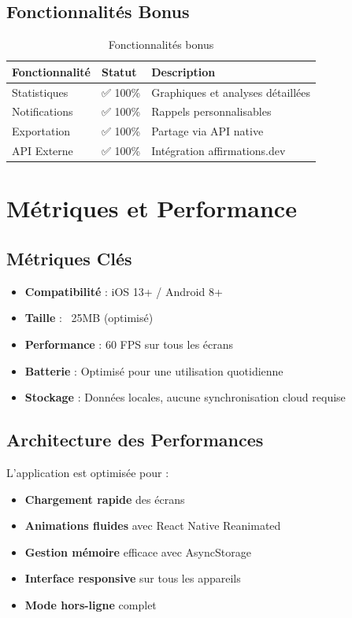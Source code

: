 \documentclass[12pt,a4paper]{article}
\begin{document}
\subsection{Fonctionnalités Bonus}

\begin{table}[H]
\centering
\begin{tabular}{|l|l|l|}
\hline
\textbf{Fonctionnalité} & \textbf{Statut} & \textbf{Description} \\
\hline
Statistiques & ✅ 100\% & Graphiques et analyses détaillées \\
Notifications & ✅ 100\% & Rappels personnalisables \\
Exportation & ✅ 100\% & Partage via API native \\
API Externe & ✅ 100\% & Intégration affirmations.dev \\
\hline
\end{tabular}
\caption{Fonctionnalités bonus}
\end{table}

\section{Métriques et Performance}

\subsection{Métriques Clés}

\begin{itemize}
    \item \textbf{Compatibilité} : iOS 13+ / Android 8+
    \item \textbf{Taille} : ~25MB (optimisé)
    \item \textbf{Performance} : 60 FPS sur tous les écrans
    \item \textbf{Batterie} : Optimisé pour une utilisation quotidienne
    \item \textbf{Stockage} : Données locales, aucune synchronisation cloud requise
\end{itemize}

\subsection{Architecture des Performances}

L'application est optimisée pour :

\begin{itemize}
    \item \textbf{Chargement rapide} des écrans
    \item \textbf{Animations fluides} avec React Native Reanimated
    \item \textbf{Gestion mémoire} efficace avec AsyncStorage
    \item \textbf{Interface responsive} sur tous les appareils
    \item \textbf{Mode hors-ligne} complet
\end{itemize}
\end{document}
